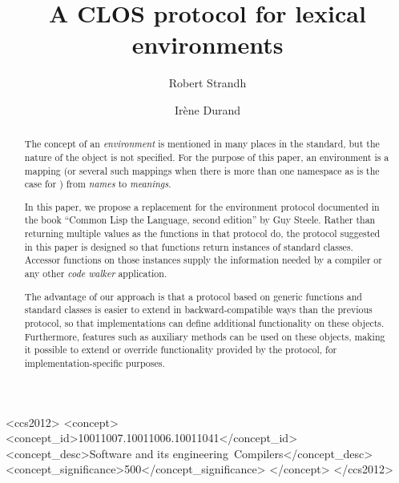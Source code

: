\documentclass[format=sigconf]{acmart}
\def\inputtex#1{}
\begin{document}
\title{A CLOS protocol for lexical environments}

\author{Robert Strandh}

\author{Irène Durand
}

\begin{abstract}
The concept of an \emph{environment} is mentioned in many places in
the \commonlisp{} standard, but the nature of the object is not
specified.  For the purpose of this paper, an environment is a mapping
(or several such mappings when there is more than one namespace as is
the case for \commonlisp{}) from \emph{names} to \emph{meanings}.

In this paper, we propose a replacement for the environment protocol
documented in the book ``Common Lisp the Language, second edition'' by
Guy Steele.  Rather than returning multiple values as the functions in
that protocol do, the protocol suggested in this paper is designed so
that functions return instances of standard classes.  Accessor
functions on those instances supply the information needed by a
compiler or any other \emph{code walker} application.

The advantage of our approach is that a protocol based on generic
functions and standard classes is easier to extend in
backward-compatible ways than the previous protocol, so that
implementations can define additional functionality on these objects.
Furthermore, \clos{} features such as auxiliary methods can be used on
these objects, making it possible to extend or override functionality
provided by the protocol, for implementation-specific purposes.
\end{abstract}

\begin{CCSXML}
<ccs2012>
<concept>
<concept_id>10011007.10011006.10011041</concept_id>
<concept_desc>Software and its engineering~Compilers</concept_desc>
<concept_significance>500</concept_significance>
</concept>
</ccs2012>
\end{CCSXML}



\maketitle

\inputtex{spec-macros.tex}

\inputtex{sec-introduction.tex}
\inputtex{sec-previous.tex}
\inputtex{sec-our-method.tex}
\inputtex{sec-benefits.tex}
\inputtex{sec-disadvantages.tex}
\inputtex{sec-conclusions.tex}
\inputtex{sec-acknowledgements.tex}


\end{document}
